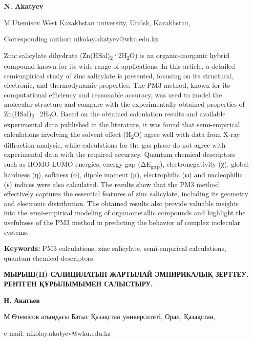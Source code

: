 {\bfseries N. Akatyev}

M.Utemisov West Kazakhstan university, Uralsk, Kazakhstan,

Corresponding author: nikolay.akatyev@wku.edu.kz

Zinc salicylate dihydrate
(Zn(HSal)\textsubscript{2}·2H\textsubscript{2}O) is an organic-inorganic
hybrid compound known for its wide range of applications. In this
article, a detailed semiempirical study of zinc salicylate is presented,
focusing on its structural, electronic, and thermodynamic properties.
The PM3 method, known for its computational efficiency and reasonable
accuracy, was used to model the molecular structure and compare with the
experimentally obtained properties of
Zn(HSal)\textsubscript{2}·2H\textsubscript{2}O. Based on the obtained
calculation results and available experimental data published in the
literature, it was found that semi-empirical calculations involving the
solvent effect (H\textsubscript{2}O) agree well with data from X-ray
diffraction analysis, while calculations for the gas phase do not agree
with experimental data with the required accuracy. Quantum chemical
descriptors such as HOMO-LUMO energies, energy gap
(ΔE\textsubscript{gap}), electronegativity (χ), global hardness (η),
softness (σ), dipole moment (μ), electrophilic (ω) and nucleophilic (ε)
indices were also calculated. The results show that the PM3 method
effectively captures the essential features of zinc salicylate,
including its geometry and electronic distribution. The obtained results
also provide valuable insights into the semi-empirical modeling of
organometallic compounds and highlight the usefulness of the PM3 method
in predicting the behavior of complex molecular systems.

{\bfseries Keywords:} PM3 calculations, zinc salicylate, semi-empirical
calculations, quantum chemical descriptors.

{\bfseries МЫРЫШ(II) САЛИЦИЛАТЫН ЖАРТЫЛАЙ ЭМПИРИКАЛЫҚ ЗЕРТТЕУ. РЕНТГЕН
ҚҰРЫЛЫМЫМЕН САЛЫСТЫРУ.}

{\bfseries Н. Акатьев}

М.Өтемісов атындағы Батыс Қазақстан университеті, Орал, Қазақстан,

e-mail: nikolay.akatyev@wku.edu.kz

